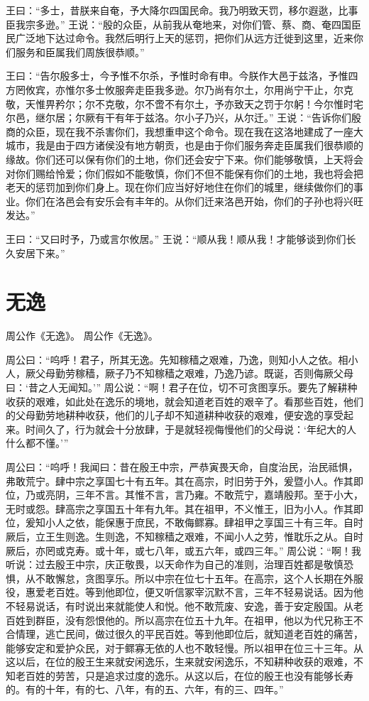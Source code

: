 \documentclass[a4paper,12pt,UTF8,twoside]{ctexbook}
\begin{document}
王曰：“多士，昔朕来自奄，予大降尔四国民命。我乃明致天罚，移尔遐逖，比事臣我宗多逊。”
王说：“殷的众臣，从前我从奄地来，对你们管、蔡、商、奄四国臣民广泛地下达过命令。我然后明行上天的惩罚，把你们从远方迁徙到这里，近来你们服务和臣属我们周族很恭顺。”

王曰：“告尔殷多士，今予惟不尔杀，予惟时命有申。今朕作大邑于兹洛，予惟四方罔攸宾，亦惟尔多士攸服奔走臣我多逊。尔乃尚有尔土，尔用尚宁干止，尔克敬，天惟畀矜尔；尔不克敬，尔不啻不有尔土，予亦致天之罚于尔躬！今尔惟时宅尔邑，继尔居；尔厥有干有年于兹洛。尔小子乃兴，从尔迁。”
王说：“告诉你们殷商的众臣，现在我不杀害你们，我想重申这个命令。现在我在这洛地建成了一座大城市，我是由于四方诸侯没有地方朝贡，也是由于你们服务奔走臣属我们很恭顺的缘故。你们还可以保有你们的土地，你们还会安宁下来。你们能够敬慎，上天将会对你们赐给怜爱；你们假如不能敬慎，你们不但不能保有你们的土地，我也将会把老天的惩罚加到你们身上。现在你们应当好好地住在你们的城里，继续做你们的事业。你们在洛邑会有安乐会有丰年的。从你们迁来洛邑开始，你们的子孙也将兴旺发达。”

王曰：“又曰时予，乃或言尔攸居。”
王说：“顺从我！顺从我！才能够谈到你们长久安居下来。”

\chapter{无逸}

周公作《无逸》。
周公作《无逸》。

周公曰：“呜呼！君子，所其无逸。先知稼穑之艰难，乃逸，则知小人之依。相小人，厥父母勤劳稼穑，厥子乃不知稼穑之艰难，乃逸乃谚。既诞，否则侮厥父母曰：‘昔之人无闻知。’”
周公说：“啊！君子在位，切不可贪图享乐。要先了解耕种收获的艰难，如此处在逸乐的境地，就会知道老百姓的艰辛了。看那些百姓，他们的父母勤劳地耕种收获，他们的儿子却不知道耕种收获的艰难，便安逸的享受起来。时间久了，行为就会十分放肆，于是就轻视侮慢他们的父母说：‘年纪大的人什么都不懂。’”

周公曰：“呜呼！我闻曰：昔在殷王中宗，严恭寅畏天命，自度治民，治民祗惧，弗敢荒宁。肆中宗之享国七十有五年。其在高宗，时旧劳于外，爰暨小人。作其即位，乃或亮阴，三年不言。其惟不言，言乃雍。不敢荒宁，嘉靖殷邦。至于小大，无时或怨。肆高宗之享国五十年有九年。其在祖甲，不义惟王，旧为小人。作其即位，爰知小人之依，能保惠于庶民，不敢侮鳏寡。肆祖甲之享国三十有三年。自时厥后，立王生则逸。生则逸，不知稼穑之艰难，不闻小人之劳，惟耽乐之从。自时厥后，亦罔或克寿。或十年，或七八年，或五六年，或四三年。”
周公说：“啊！我听说：过去殷王中宗，庆正敬畏，以天命作为自己的准则，治理百姓都是敬慎恐惧，从不敢懈怠，贪图享乐。所以中宗在位七十五年。在高宗，这个人长期在外服役，惠爱老百姓。等到他即位，便又听信冢宰沉默不言，三年不轻易说话。因为他不轻易说话，有时说出来就能使人和悦。他不敢荒废、安逸，善于安定殷国。从老百姓到群臣，没有怨恨他的。所以高宗在位五十九年。在祖甲，他以为代兄称王不合情理，逃亡民间，做过很久的平民百姓。等到他即位后，就知道老百姓的痛苦，能够安定和爱护众民，对于鳏寡无依的人也不敢轻慢。所以祖甲在位三十三年。从这以后，在位的殷王生来就安闲逸乐，生来就安闲逸乐，不知耕种收获的艰难，不知老百姓的劳苦，只是追求过度的逸乐。从这以后，在位的殷王也没有能够长寿的。有的十年，有的七、八年，有的五、六年，有的三、四年。”
\end{document}
